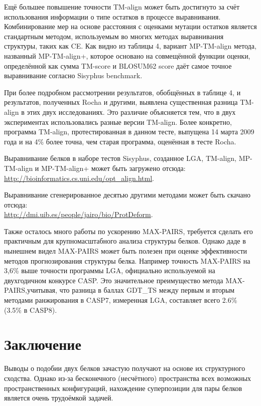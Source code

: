 \documentclass[a4paper]{extreport}
\begin{document}
Ещё большее повышение точности TM-align может быть достигнуто за счёт использования информации о типе остатков в процессе выравнивания. Комбинирование мер на основе расстояния с оценками мутации остатков является стандартным методом, используемым во многих методах выравнивания структуры, таких как CE. Как видно из таблицы 4, вариант MP-TM-align метода, названный MP-TM-align+, которое основано на совмещённой функции оценки, определённой как сумма TM-score и BLOSUM62 score даёт самое точное выравнивание согласно Sisyphus benchmark.

При более подробном рассмотрении результатов, обобщённых в таблице 4, и результатов, полученных Rocha и другими, выявлена существенная разница TM-align в этих двух исследованиях. Это различие объясняется тем, что в двух экспериментах использовались разные версии TM-align. Более конкретно, программа TM-align, протестированная в данном тесте, выпущена 14 марта 2009 года и на 4\% более точна, чем старая программа, оценённая в тесте Rocha.

Выравнивание белков в наборе тестов Sisyphus, созданное LGA, TM-align, MP-TM-align и MP-TM-align+ может быть загружено отсюда:\\
\url{http://bioinformatics.cs.uni.edu/opt_align.html}. 

Выравнивание сгенерированное десятью другими методами может быть скачано отсюда:\\ 
\url{http://dmi.uib.es/people/jairo/bio/ProtDeform}.

Также осталось много работы по ускорению MAX-PAIRS, требуется сделать его практичным для крупномасштабного анализа структуры белков. Однако даде в нынешнем видел MAX-PAIRS может быть полезен при оценке эффективности методов прогнозирования структуры белка. Например точность MAX-PAIRS на 3,6\% выше точности программы LGA, официально используемой на двухгодичном конкурсе CASP. Это значительное преимущество метода MAX-PAIRS,учитывая, что разница в баллах GDT\_TS между первым и вторым методами ранжирования в CASP7, измеренная LGA, составляет всего 2.6\% (3.5\% в CASP8).

\chapter*{Заключение}

Выводы о подобии двух белков зачастую получают на основе их структурного сходства. Однако из-за бесконечного (несчётного) пространства всех возможных пространственных конфигураций, нахождение суперпозиции для пары белков является очень трудоёмкой задачей.
\end{document}
